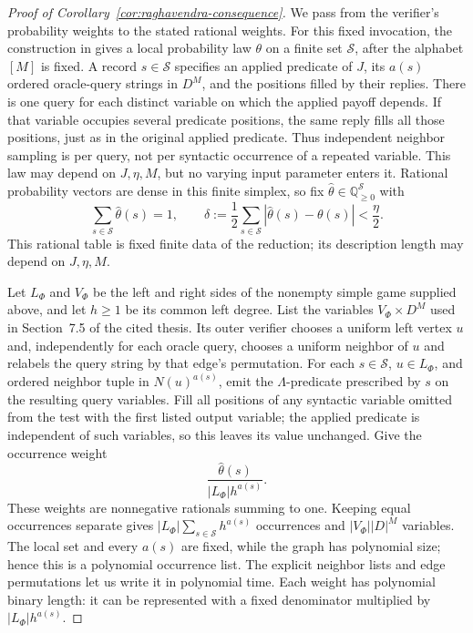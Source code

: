 \begin{proof}[Proof of Corollary~\ref{cor:raghavendra-consequence}]
We pass from the verifier's probability weights to the stated rational
weights. For this fixed invocation, the construction in
\cite[Sections~7.3.1 and~7.5]{RaghavendraThesis09} gives a local
probability law \(\theta\) on a finite set \(\mathcal S\), after the
alphabet \([M]\) is fixed. A record \(s\in\mathcal S\) specifies an
applied predicate of \(J\), its \(a(s)\) ordered oracle-query strings
in \(D^M\), and the positions filled by their replies.
There is one query for each distinct variable on which the applied
payoff depends.  If that variable occupies several predicate positions,
the same reply fills all those positions, just as in the original
applied predicate.  Thus independent neighbor sampling is per query,
not per syntactic occurrence of a repeated variable.
This law may
depend on \(J,\eta,M\), but no varying input parameter enters it.
Rational probability vectors are dense in this finite simplex, so fix
\(\widehat\theta\in\mathbb Q_{\ge0}^{\mathcal S}\) with
\[
 \sum_{s\in\mathcal S}\widehat\theta(s)=1,
 \qquad
 \delta:=\frac12\sum_{s\in\mathcal S}
       |\widehat\theta(s)-\theta(s)|<\frac{\eta}{2}.
\]
This rational table is fixed finite data of the reduction; its
description length may depend on \(J,\eta,M\).

Let \(L_\Phi\) and \(V_\Phi\) be the left and right sides of the
nonempty simple game supplied above, and let \(h\ge1\) be its common
left degree.
List the variables \(V_\Phi\times D^M\) used in Section~7.5 of the
cited thesis. Its outer verifier chooses a uniform left vertex \(u\)
and, independently for each
oracle query, chooses a uniform neighbor of \(u\) and relabels the
query string by that edge's permutation. For each \(s\in\mathcal S\),
\(u\in L_\Phi\), and ordered neighbor tuple in \(N(u)^{a(s)}\), emit
the \(\Lambda\)-predicate prescribed by \(s\) on the resulting query
variables. Fill all positions of any syntactic variable omitted from
the test with the first listed output variable; the applied predicate
is independent of such variables, so this leaves its value unchanged.
Give the occurrence
weight
\[
 \frac{\widehat\theta(s)}{|L_\Phi|h^{a(s)}}.
\]
These weights are nonnegative rationals summing to one. Keeping equal
occurrences separate gives
\(|L_\Phi|\sum_{s\in\mathcal S}h^{a(s)}\) occurrences and
\(|V_\Phi||D|^M\) variables. The local set and every \(a(s)\) are
fixed, while the graph has polynomial size; hence this is a polynomial
occurrence list. The explicit neighbor lists and edge permutations let
us write it in polynomial time. Each weight has polynomial binary
length: it can be represented with a fixed denominator multiplied by
\(|L_\Phi|h^{a(s)}\).


\end{proof}
